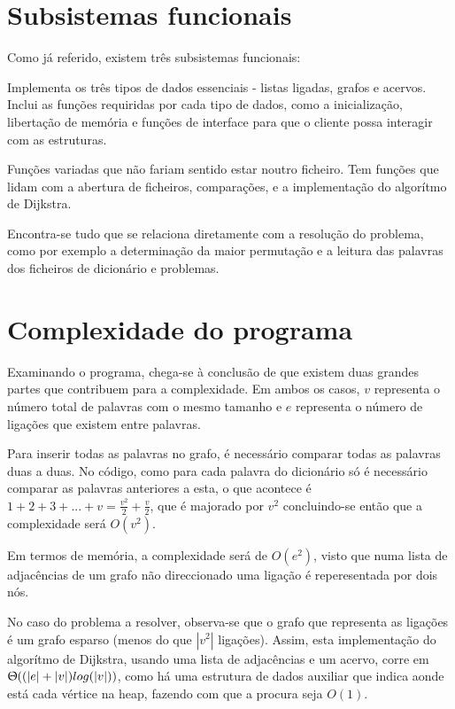 \documentclass[a4paper, 11pt]{article}
\begin{document}
\section{Subsistemas funcionais}
    \par Como já referido, existem três subsistemas funcionais:
    \begin{description}[align=left]
       \item[datastructs.c] Implementa os três tipos de dados essenciais - listas ligadas, grafos e acervos. Inclui as funções requiridas por cada tipo de dados, como a inicialização, libertação de memória e funções de interface para que o cliente possa interagir com as estruturas.
       \item[utils.c] Funções variadas que não fariam sentido estar noutro ficheiro. Tem funções que lidam com a abertura de ficheiros, comparações, e a implementação do algorítmo de Dijkstra.
       \item[words.c] Encontra-se tudo que se relaciona diretamente com a resolução do problema, como por exemplo a determinação da maior permutação e a leitura das palavras dos ficheiros de dicionário e problemas.
    \end{description}

\section{Complexidade do programa}
    \par Examinando o programa, chega-se à conclusão de que existem duas grandes partes que contribuem para a complexidade. Em ambos os casos, $v$ representa o número total de palavras com o mesmo tamanho e $e$ representa o número de ligações que existem entre palavras.
    \begin{description}[align=left]
        \item[Criação de grafo] Para inserir todas as palavras no grafo, é necessário comparar todas as palavras duas a duas. No código, como para cada palavra do dicionário só é necessário comparar as palavras anteriores a esta, o que acontece é $1 + 2 + 3 + ... + v = \frac{v^2}{2} + \frac{v}{2}$, que é majorado por $v^2$ concluindo-se então que a complexidade será $O(v^2)$.
        \par Em termos de memória, a complexidade será de $O(e^2)$, visto que numa lista de adjacências de um grafo não direccionado uma ligação é reperesentada por dois nós.
        \item[Algorítmo de Dijkstra] No caso do problema a resolver, observa-se que o grafo que representa as ligações é um grafo esparso (menos do que $|v^2|$ ligações). Assim, esta implementação do algorítmo de Dijkstra, usando uma lista de adjacências e um acervo, corre em $\Uptheta((|e| + |v|)log(|v|))$, como há uma estrutura de dados auxiliar que indica aonde está cada vértice na heap, fazendo com que a procura seja $O(1)$.
    \end{description}
\end{document}
